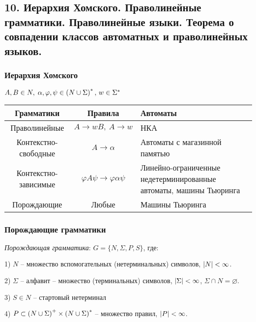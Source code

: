 \subsection{10. Иерархия Хомского. Праволинейные грамматики. Праволинейные языки. Теорема о совпадении классов автоматных и праволинейных языков.}

\subsubsection*{Иерархия Хомского}

$A, B \in N, \; \alpha, \varphi, \psi \in \left({N \cup \Sigma}\right)^{*}, \, w \in \Sigma^*$

\begin{center}
    \centering
    \begin{tabular}{|c|c|p{250px}|}
        \hline
         Грамматики &
         Правила &
         Автоматы \\
         \hline
         Праволинейные &
         $A \rightarrow wB, \ A \rightarrow w$ &
         НКА \\
         \hline
         Контекстно-свободные &
         $A \rightarrow \alpha$ &
         Автоматы с магазинной памятью \\
         \hline
         Контекстно-зависимые &
         $\varphi A \psi \rightarrow \varphi \alpha \psi$ &
         Линейно-ограниченные недетерминированные автоматы, машины Тьюринга \\
         \hline
         Порождающие &
         Любые &
         Машины Тьюринга \\
         \hline
    \end{tabular}
\end{center}

\subsubsection*{Порождающие грамматики}

\Def
\textit{Порождающая грамматика}: $G = \{N, \Sigma, P, S\}$, где:

1) $N$ -- множество вспомогательных (нетерминальных) символов, $\left|{N}\right| < \infty$.

2) $\Sigma$ -- алфавит -- множество (терминальных) символов, $\left|{\Sigma}\right| < \infty$, $\Sigma \cap N = \varnothing$.

3) $S \in N$ -- стартовый нетерминал

4) $P \subset \left({N \cup \Sigma}\right)^{+} \times \left({N \cup \Sigma}\right)^{*}$ -- множество правил, $\left|{P}\right| < \infty$.

